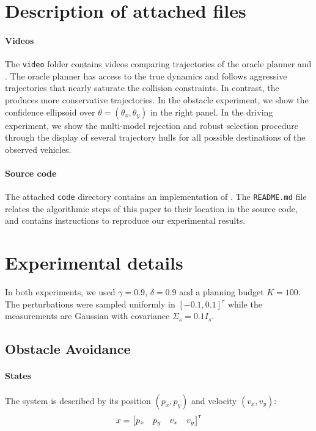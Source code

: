 \documentclass{article}
\begin{document}
\section{Description of attached files}
\label{sec:attachments}

\paragraph{Videos}
The \texttt{video} folder contains videos comparing trajectories of the oracle planner and . The oracle planner has access to the true dynamics and follows aggressive trajectories that nearly saturate the collision constraints. In contrast, the  produces more conservative trajectories. In the obstacle experiment, we show the confidence ellipsoid over $\theta = (\theta_x,\theta_y)$ in the right panel. In the driving experiment, we show the multi-model rejection and robust selection procedure through the display of several trajectory hulls for all possible destinations of the observed vehicles.

\paragraph{Source code}
The attached \texttt{code} directory contains an implementation of . The \texttt{README.md} file relates the algorithmic steps of this paper to their location in the source code, and contains instructions to reproduce our experimental results.

\section{Experimental details}
\label{sec:experimental-setting}

In both experiments, we used $\gamma=0.9$,  $\delta=0.9$ and a planning budget $K=100$. The perturbations were sampled uniformly in $[-0.1, 0.1]^r$ while the measurements are Gaussian with covariance $\Sigma_s = 0.1 I_s$. 

\subsection{Obstacle Avoidance}

\paragraph{States}

The system is described by its position $(p_x,p_y)$ and velocity $(v_x, v_y)$:
\begin{equation*}
x = \begin{bmatrix}
p_x & p_y & v_x & v_y
\end{bmatrix}^{\mathsf{\scriptscriptstyle T}}
\end{equation*}
\end{document}
